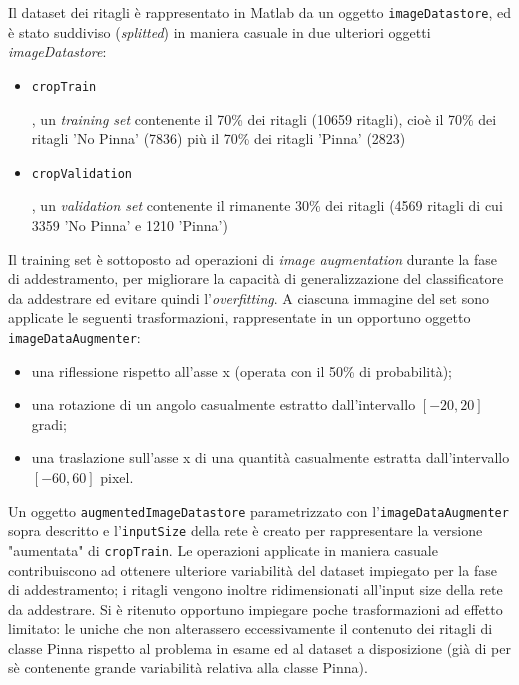 Il dataset dei ritagli è rappresentato in Matlab da un oggetto \verb|imageDatastore|, ed è stato suddiviso (\textit{splitted}) in maniera casuale in due ulteriori oggetti \textit{imageDatastore}:

\begin{itemize}
\item \begin{frame}\space \verb|cropTrain|\end{frame}, un \textit{training set} contenente il 70\% dei ritagli (10659 ritagli), cioè il 70\% dei ritagli 'No Pinna' (7836) più il 70\% dei ritagli 'Pinna' (2823)
\item \begin{frame}\space \verb|cropValidation|\end{frame}, un \textit{validation set} contenente il rimanente 30\% dei ritagli (4569 ritagli di cui 3359 'No Pinna' e 1210 'Pinna')
\end{itemize}

Il training set è sottoposto ad operazioni di \textit{image augmentation} durante la fase di addestramento, per migliorare la capacità di generalizzazione del classificatore da addestrare ed evitare quindi l'\textit{overfitting}.
A ciascuna immagine del set sono applicate le seguenti trasformazioni, rappresentate in un opportuno oggetto \verb|imageDataAugmenter|:

\begin{itemize}
\item una riflessione rispetto all’asse x (operata con il 50\% di probabilità);
\item una rotazione di un angolo casualmente estratto dall’intervallo $[-20, 20]$ gradi;
\item una traslazione sull’asse x di una quantità casualmente estratta dall’intervallo
$[-60, 60]$ pixel.
\end{itemize}

\noindent Un oggetto \verb|augmentedImageDatastore| parametrizzato con l'\verb|imageDataAugmenter| sopra descritto e l'\verb|inputSize| della rete è creato per rappresentare la versione "aumentata" di \verb|cropTrain|.
Le operazioni applicate in maniera casuale contribuiscono ad ottenere ulteriore variabilità del dataset impiegato per la fase di addestramento; i ritagli vengono inoltre ridimensionati all'input size della rete da addestrare. Si è ritenuto opportuno impiegare poche trasformazioni ad effetto limitato: le uniche che non alterassero eccessivamente il contenuto dei ritagli di classe Pinna rispetto al problema in esame ed al dataset a disposizione (già di per sè contenente grande variabilità relativa alla classe Pinna).

